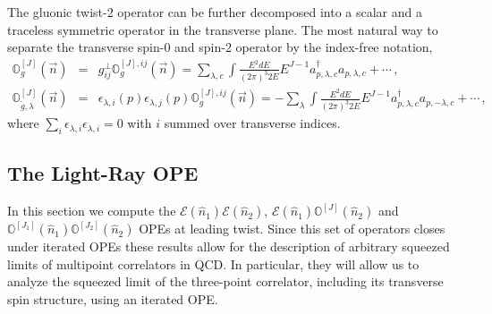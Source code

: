 \documentclass[letterpaper,11pt]{article}
\def\bea{\begin{eqnarray}}
\def\eea{\end{eqnarray}}
\begin{document}
The gluonic twist-2 operator can be further decomposed into a scalar and a traceless symmetric operator in the transverse plane. The most natural way to separate the transverse spin-0 and spin-2 operator by the index-free notation,
\bea
\mathbb{O}_{g}^{[J]}(\vec{n})&=&g^{\perp}_{ij} \mathbb{O}_g^{[J],ij}(\vec{n})=\sum_{\lambda, c} \int\!\! \frac{E^2 dE}{(2\pi)^3 2E} E^{J-1} a^{\dagger}_{p,\lambda,c} a_{p,\lambda,c}+\cdots\,, \label{eq: unpolarized_gluon}\\
\mathbb{O}_{\tilde{g},\lambda}^{[J]}(\vec{n})&=&\epsilon_{\lambda, i}(p)\epsilon_{\lambda,j}(p)\mathbb{O}_g^{[J],ij}(\vec{n})=-\sum_{\lambda} \int\!\! \frac{E^2 dE}{(2\pi)^3 2E}  E^{J-1} a^{\dagger}_{p,\lambda,c} a_{p,-\lambda,c}+\cdots\,, \label{eq: polarized_gluon}
\eea
where $\sum_i \epsilon_{\lambda, i} \epsilon_{\lambda,i} = 0$ with $i$ summed over transverse indices.

\subsection{The Light-Ray OPE}

In this section we compute the $\mathcal{E}(\hat n_1) \mathcal{E}(\hat n_2)$, $\mathcal{E}(\hat n_1) \mathbb{O}^{[J]}(\hat n_2) $ and $\mathbb{O}^{[J_1]}(\hat n_1) \mathbb{O}^{[J_2]}(\hat n_2) $ OPEs at leading twist. Since this set of operators closes under iterated OPEs these results allow for the description of arbitrary squeezed limits of multipoint correlators in QCD. In particular, they will allow us to analyze the squeezed limit of the three-point correlator, including its transverse spin structure, using an iterated OPE. 
\end{document}
